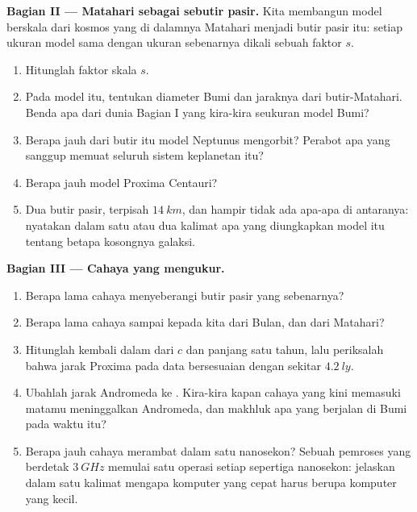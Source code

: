 \begin{problem}
\medskip
\noindent\textbf{Bagian II --- Matahari sebagai sebutir pasir.}
Kita membangun model berskala dari kosmos yang di dalamnya Matahari
menjadi butir pasir itu: setiap ukuran model sama dengan ukuran
sebenarnya dikali sebuah faktor $s$.
\begin{enumerate}[resume]
  \item Hitunglah faktor skala $s$.
  \item Pada model itu, tentukan diameter Bumi dan jaraknya dari
        butir-Matahari. Benda apa dari dunia Bagian I yang kira-kira
        seukuran model Bumi?
  \item Berapa jauh dari butir itu model Neptunus mengorbit? Perabot
        apa yang sanggup memuat seluruh sistem keplanetan itu?
  \item Berapa jauh model Proxima Centauri?
  \item Dua butir pasir, terpisah $\qty{14}{km}$, dan hampir tidak ada
        apa-apa di antaranya: nyatakan dalam satu atau dua kalimat apa
        yang diungkapkan model itu tentang betapa kosongnya galaksi.
\end{enumerate}

\medskip
\noindent\textbf{Bagian III --- Cahaya yang mengukur.}
\begin{enumerate}[resume]
  \item Berapa lama cahaya menyeberangi butir pasir yang sebenarnya?
  \item Berapa lama cahaya sampai kepada kita dari Bulan, dan dari
        Matahari?
  \item Hitunglah kembali  dalam  dari $c$ dan panjang
        satu tahun, lalu periksalah bahwa jarak Proxima pada data
        bersesuaian dengan sekitar $\qty{4.2}{ly}$.
  \item Ubahlah jarak Andromeda ke . Kira-kira kapan cahaya
        yang kini memasuki matamu meninggalkan Andromeda, dan makhluk
        apa yang berjalan di Bumi pada waktu itu?
  \item Berapa jauh cahaya merambat dalam satu nanosekon? Sebuah
        pemroses yang berdetak $\qty{3}{GHz}$ memulai satu operasi
        setiap sepertiga nanosekon: jelaskan dalam satu kalimat
        mengapa komputer yang cepat harus berupa komputer yang kecil.
\end{enumerate}


\end{problem}
